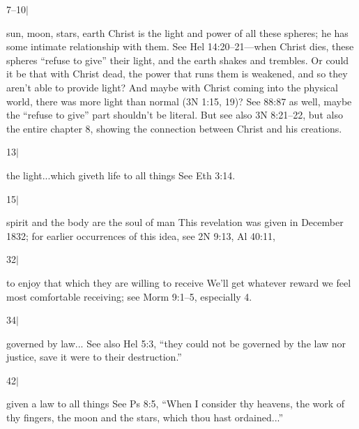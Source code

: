 		\begin{compactdesc}
		
		\item[7--10$\vert$]
		\begin{compactdesc}
		\item[sun, moon, stars, earth] Christ is the light and power of all these spheres; he has some intimate relationship with them. See Hel 14:20--21---when Christ dies, these spheres ``refuse to give'' their light, and the earth shakes and trembles. Or could it be that with Christ dead, the power that runs them is weakened, and so they aren't able to provide light? And maybe with Christ coming into the physical world, there was more light than normal (3N 1:15, 19)? See 88:87 as well, maybe the ``refuse to give'' part shouldn't be literal. But see also 3N 8:21--22, but also the entire chapter 8, showing the connection between Christ and his creations.
		\end{compactdesc}
		
		\item[13$\vert$]
		\begin{compactdesc}
		\item[the light...which giveth life to all things] See Eth 3:14.
		\end{compactdesc}
		
		\item[15$\vert$]
		\begin{compactdesc}
		\item[spirit and the body are the soul of man] This revelation was given in December 1832; for earlier occurrences of this idea, see 2N 9:13, Al 40:11, 
		\end{compactdesc}
		
		\item[32$\vert$]
		\begin{compactdesc}
		\item[to enjoy that which they are willing to receive] We'll get whatever reward we feel most comfortable receiving; see Morm 9:1--5, especially 4.
		\end{compactdesc}
		
		\item[34$\vert$]
		\begin{compactdesc}
		\item[governed by law...] See also Hel 5:3, ``they could not be governed by the law nor justice, save it were to their destruction.''
		\end{compactdesc}
		
		\item[42$\vert$]
		\begin{compactdesc}
		\item[given a law to all things] See Ps 8:5, ``When I consider thy heavens, the work of thy fingers, the moon and the stars, which thou hast ordained...''
		\end{compactdesc}
		

\end{compactdesc}
